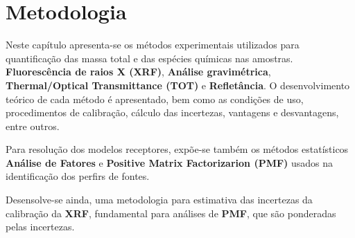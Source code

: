 \chapter{Metodologia}

Neste capítulo apresenta-se os métodos experimentais utilizados para 
quantificação das massa total e das espécies químicas nas amostras. 
\textbf{Fluorescência de raios X (XRF)}, \textbf{Análise gravimétrica},
\textbf{Thermal/Optical Transmittance (TOT)} e \textbf{Refletância}.
O desenvolvimento teórico de cada método é apresentado, bem como 
as condições de uso, procedimentos de calibração, cálculo das incertezas, 
vantagens e desvantagens, entre outros.

Para resolução dos modelos receptores, expõe-se também os métodos 
estatísticos \textbf{Análise de Fatores} e 
\textbf{Positive Matrix Factorizarion (PMF)} usados na identificação 
dos perfirs de fontes. 

Desensolve-se ainda, uma metodologia para estimativa das incertezas
da calibração da \textbf{XRF}, fundamental para análises de \textbf{PMF},
que são ponderadas pelas incertezas.






